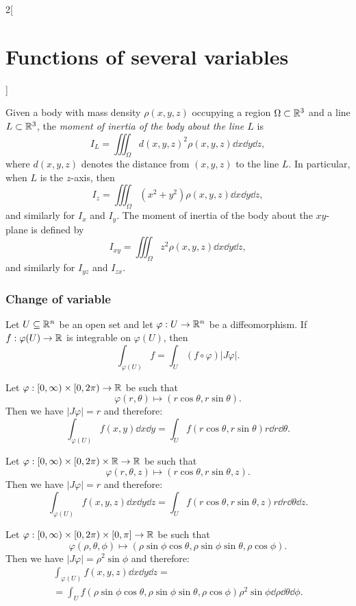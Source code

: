 \documentclass[../../../main.tex]{subfiles}
\begin{document}
\begin{multicols}{2}[\section{Functions of several variables}]
\begin{definition}
    \end{definition}
    \begin{definition}
        Given a body with mass density $\rho(x,y,z)$ occupying a region $\Omega\subset\mathbb{R}^3$ and a line $L\subset\mathbb{R}^3$, the \textit{moment of inertia of the body about the line $L$} is $$I_L=\iiint_\Omega d(x,y,z)^2\rho(x,y,z)\dd x\dd y\dd z,$$ where $d(x,y,z)$ denotes the distance from $(x,y,z)$ to the line $L$. In particular, when $L$ is the $z$-axis, then $$I_z=\iiint_\Omega (x^2+y^2)\rho(x,y,z)\dd x\dd y\dd z,$$ and similarly for $I_x$ and $I_y$. The moment of inertia of the body about the $xy$-plane is defined by $$I_{xy}=\iiint_\Omega z^2\rho(x,y,z)\dd x\dd y\dd z,$$ and similarly for $I_{yz}$ and $I_{zx}.$
    \end{definition}
    \subsubsection*{Change of variable}
    \begin{theorem}
        Let $U\subseteq\mathbb{R}^n$ be an open set and let $\varphi:U\rightarrow\mathbb{R}^n$ be a diffeomorphism. If $f:\varphi(U)\rightarrow\mathbb{R} $ is integrable on $\varphi(U)$, then $$\int_{\varphi(U)} f=\int_U(f\circ\varphi)|J\varphi|.$$
    \end{theorem}
    \begin{corollary}
        Let $\varphi:[0,\infty)\times[0,2\pi)\rightarrow\mathbb{R} $ be such that
        $$\varphi(r,\theta)\longmapsto(r\cos\theta,r\sin\theta).$$
        Then we have $|J\varphi|=r$ and therefore: $$\int_{\varphi(U)}f(x,y)\dd x\dd y=\int_Uf(r\cos\theta,r\sin\theta)r\dd r \dd\theta.$$
    \end{corollary}
    \begin{corollary}
        Let $\varphi:[0,\infty)\times[0,2\pi)\times\mathbb{R} \rightarrow\mathbb{R} $ be such that $$\varphi(r,\theta,z)\longmapsto(r\cos\theta,r\sin\theta,z).$$
        Then we have $|J\varphi|=r$ and therefore: $$\int_{\varphi(U)}f(x,y,z)\dd x\dd y\dd z=\int_Uf(r\cos\theta,r\sin\theta,z)r\dd r \dd\theta \dd z.$$
    \end{corollary}
    \begin{corollary}
        Let $\varphi:[0,\infty)\times[0,2\pi)\times[0,\pi]\rightarrow\mathbb{R} $ be such that $$\varphi(\rho,\theta,\phi)\longmapsto(\rho\sin\phi\cos\theta,\rho\sin\phi\sin\theta,\rho\cos\phi).$$
        Then we have $|J\varphi|=\rho^2\sin\phi$ and therefore:
        \begin{multline*}
            \int_{\varphi(U)}f(x,y,z)\dd x\dd y\dd z=\\=\int_Uf(\rho\sin\phi\cos\theta,\rho\sin\phi\sin\theta,\rho\cos\phi)\rho^2\sin\phi \dd \rho \dd \theta \dd \phi.
        \end{multline*}
    \end{corollary}

\end{multicols}
\end{document}
